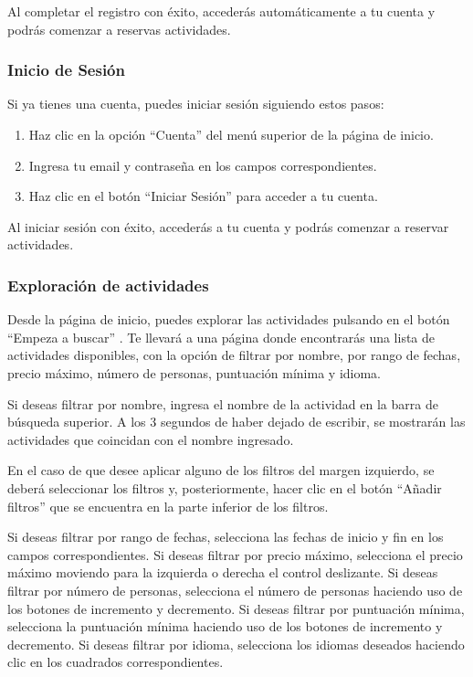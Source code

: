 Al completar el registro con éxito, accederás automáticamente a tu cuenta y podrás comenzar a reservas actividades.

\subsubsection{Inicio de Sesión}
Si ya tienes una cuenta, puedes iniciar sesión siguiendo estos pasos:

\begin{enumerate}
	\item Haz clic en la opción “Cuenta” del menú superior de la página de inicio.
	\item Ingresa tu email y contraseña en los campos correspondientes.
	\item Haz clic en el botón “Iniciar Sesión” para acceder a tu cuenta.
\end{enumerate}

Al iniciar sesión con éxito, accederás a tu cuenta y podrás comenzar a reservar actividades.

\subsubsection{Exploración de actividades}
Desde la página de inicio, puedes explorar las actividades pulsando en el botón “Empeza a buscar” . Te llevará a una página donde encontrarás una lista de actividades disponibles, con la opción de filtrar por nombre, por rango de fechas, precio máximo, número de personas, puntuación mínima y idioma.

Si deseas filtrar por nombre, ingresa el nombre de la actividad en la barra de búsqueda superior. A los 3 segundos de haber dejado de escribir, se mostrarán las actividades que coincidan con el nombre ingresado.

En el caso de que desee aplicar alguno de los filtros del margen izquierdo, se deberá seleccionar los filtros y, posteriormente, hacer clic en el botón “Añadir filtros” que se encuentra en la parte inferior de los filtros.

Si deseas filtrar por rango de fechas, selecciona las fechas de inicio y fin en los campos correspondientes.
Si deseas filtrar por precio máximo, selecciona el precio máximo moviendo para la izquierda o derecha el control deslizante.
Si deseas filtrar por número de personas, selecciona el número de personas haciendo uso de los botones de incremento y decremento.
Si deseas filtrar por puntuación mínima, selecciona la puntuación mínima haciendo uso de los botones de incremento y decremento.
Si deseas filtrar por idioma, selecciona los idiomas deseados haciendo clic en los cuadrados correspondientes.

